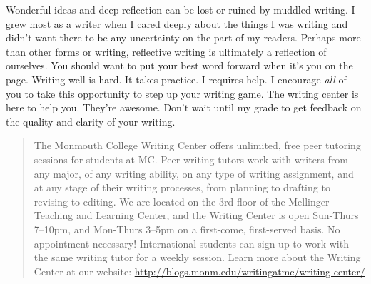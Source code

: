 \documentclass[nobib]{tufte-handout}
\begin{document}
Wonderful ideas and deep reflection can be lost or ruined by muddled writing.  I grew most as a writer when I cared deeply about the things I was writing and didn't want there to be any uncertainty on the part of my readers. Perhaps more than other forms or writing, reflective writing is ultimately a reflection of ourselves. You should want to put your best word forward when it's you on the page. Writing well is hard. It takes practice. I requires help. I encourage \textit{all} of you to take this opportunity to step up your writing game. The writing center is here to help you. They're awesome. Don't wait until my grade to get feedback on the quality and clarity of your writing.
\begin{quote}
The Monmouth College Writing Center offers unlimited, free peer tutoring sessions for students at MC\@.  Peer writing tutors work with writers from any major, of any writing ability, on any type of writing assignment, and at any stage of their writing processes, from planning to drafting to revising to editing.  We are located on the 3rd floor of the Mellinger Teaching and Learning Center, and the Writing Center is open Sun-Thurs 7--10pm, and Mon-Thurs 3--5pm on a first-come, first-served basis.  No appointment necessary!  International students can sign up to work with the same writing tutor for a weekly session. Learn more about the Writing Center at our website: \url{http://blogs.monm.edu/writingatmc/writing-center/}
\end{quote}
\end{document}
